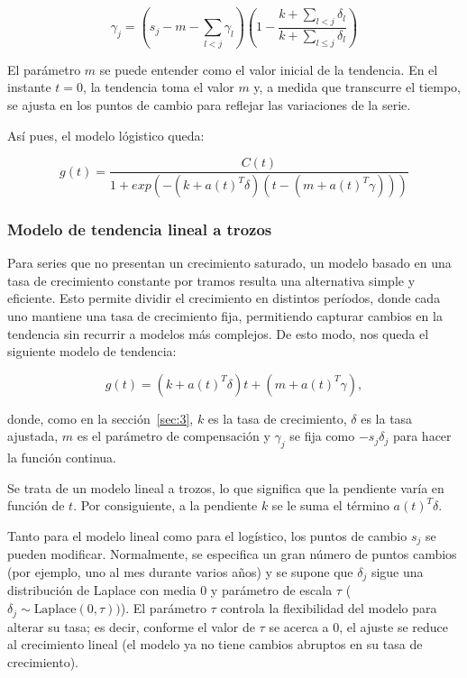\documentclass[12pt,twoside]{article}
\begin{document}
\begin{equation}
\gamma_j = \left( s_j - m - \sum_{l<j} \gamma_l \right) 
\left( 1 - \frac{k + \sum_{l<j} \delta_l}{k + \sum_{l \leq j} \delta_l} \right)
\end{equation}

El parámetro $m$ se puede entender como el valor inicial de la tendencia. En el instante $t = 0$, la tendencia toma el valor $m$ y, a medida que transcurre el tiempo, se ajusta en los puntos 
de cambio para reflejar las variaciones de la serie.


Así pues, el modelo lógistico queda: 

\begin{equation}
g(t) = \frac{C(t)}{1 + exp(-(k+a(t)^T \delta)(t-(m+a(t)^T \gamma)))}
\end{equation}

\subsubsection{Modelo de tendencia lineal a trozos}\label{sec:4}

Para series que no presentan un crecimiento saturado, un modelo basado en una tasa de crecimiento constante por tramos resulta una alternativa simple y eficiente. Esto permite dividir el crecimiento en distintos períodos, donde cada uno mantiene una tasa de crecimiento fija, permitiendo capturar cambios en la tendencia sin recurrir a modelos más complejos. De esto modo, nos queda el siguiente modelo de tendencia: 

\begin{equation}
g(t) = (k + a(t)^T \delta)t + (m + a(t)^T \gamma),
\end{equation}

donde, como en la sección~\ref{sec:3}, $k$ es la tasa de crecimiento, $\delta$ es la tasa ajustada, $m$ es el parámetro de compensación y $\gamma_j$ se fija como $-s_j \delta_j$ para hacer la función continua.

Se trata de un modelo lineal a trozos, lo que significa que la pendiente varía en función de $t$. Por consiguiente, a la pendiente $k$ se le suma el término  $a(t)^T \delta$.

Tanto para el modelo lineal como para el logístico, los puntos de cambio $s_j$ se pueden modificar. Normalmente, se especifica un gran número de puntos cambios (por ejemplo, uno al mes durante varios años) y se supone que $\delta_j$ sigue una distribución de Laplace con media $0$ y parámetro de escala $\tau$ ($\delta_j \sim \text{Laplace}(0, \tau))$). El parámetro $\tau$ controla la flexibilidad del modelo para alterar su tasa; es decir, conforme el valor de $\tau$ se acerca a $0$, el ajuste se reduce al crecimiento lineal (el modelo ya no tiene cambios abruptos en su tasa de crecimiento).
\end{document}
